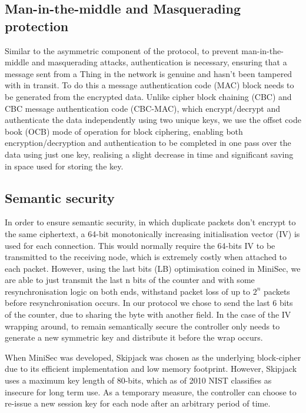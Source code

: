 \documentclass[conference]{./sty/IEEEtran}
\begin{document}
\subsection{Man-in-the-middle and Masquerading protection} %
\label{sub:man_in_the_middle_and_masquerading_protection}
Similar to the asymmetric component of the protocol, to prevent man-in-the-middle and masquerading attacks, authentication is necessary, ensuring that a message sent from a Thing in the network is genuine and hasn't been tampered with in transit. To do this a message authentication code (MAC) block needs to be generated from the encrypted data. Unlike cipher block chaining (CBC) and CBC message authentication code (CBC-MAC), which encrypt/decrypt and authenticate the data independently using two unique keys, we use the offset code book (OCB) mode of operation for block ciphering, enabling both encryption/decryption and authentication to be completed in one pass over the data using just one key, realising a slight decrease in time\cite{ContikiSec} and significant saving in space used for storing the key.

\subsection{Semantic security} %
\label{sub:semantic_security}
In order to ensure semantic security, in which duplicate packets don't encrypt to the same ciphertext, a 64-bit monotonically increasing initialisation vector (IV) is used for each connection. This would normally require the 64-bits IV to be transmitted to the receiving node, which is extremely costly when attached to each packet. However, using the last bits (LB) optimisation coined in MiniSec, we are able to just transmit the last n bits of the counter and with some resynchronisation logic on both ends, withstand packet loss of up to $2^n$ packets before resynchronisation occurs. In our protocol we chose to send the last 6 bits of the counter, due to sharing the byte with another field. In the case of the IV wrapping around, to remain semantically secure the controller only needs to generate a new symmetric key and distribute it before the wrap occurs.

When MiniSec was developed, Skipjack was chosen as the underlying block-cipher due to its efficient implementation and low memory footprint\cite{Skipjack}. However, Skipjack uses a maximum key length of 80-bits, which as of 2010 NIST classifies as insecure for long term use\cite{NIST}. As a temporary measure, the controller can choose to re-issue a new session key for each node after an arbitrary period of time.  
\end{document}
